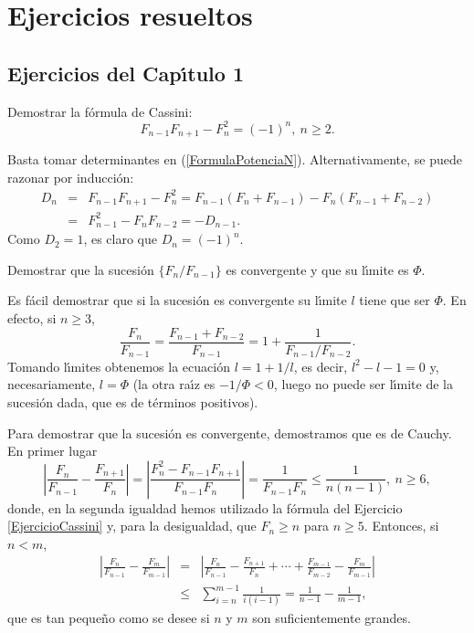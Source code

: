 \chapter{Ejercicios resueltos}
\label{ApendiceEjercicios}

\section{Ejercicios del Cap\'\i tulo 1}

\begin{exercise}\label{EjercicioCassini} Demostrar la f\'ormula de Cassini:
$$F_{n-1}F_{n+1}-F_n^2=(-1)^n,\ n\geq 2.$$
\end{exercise}

\begin{solution}
Basta tomar determinantes en (\ref{FormulaPotenciaN}). Alternativamente, se puede razonar por inducci\'on:
\begin{eqnarray*}D_n&=&F_{n-1}F_{n+1}-F_n^2=F_{n-1}(F_n+F_{n-1})-F_n(F_{n-1}+F_{n-2})\\ &=&
F_{n-1}^2-F_nF_{n-2}=-D_{n-1}.\end{eqnarray*}
Como $D_2=1$, es claro que $D_n=(-1)^n$.
\end{solution}

\begin{exercise}\label{EjercicioConvergencia} Demostrar que la sucesi\'on $\{F_n/F_{n-1}\}$ es convergente y que su l\'\i mite es $\Phi$.
\end{exercise}

\begin{solution}
Es f\'acil demostrar que si la sucesi\'on es convergente su l\'\i mite $l$ tiene que ser $\Phi$. En efecto, si $n\geq 3$,
$$\frac{F_n}{F_{n-1}}=\frac{F_{n-1}+F_{n-2}}{F_{n-1}}=1+\frac{1}{F_{n-1}/F_{n-2}}.$$
Tomando l\'\i mites obtenemos la ecuaci\'on $l=1+1/l$, es decir, $l^2-l-1=0$ y, necesariamente, $l=\Phi$ (la otra ra\'\i z es $-1/\Phi<0$, luego no puede ser l\'\i mite de la sucesi\'on dada, que es de t\'erminos positivos).

Para demostrar que la sucesi\'on es convergente, demostramos que es de Cauchy. En primer lugar
$$\left|\frac{F_n}{F_{n-1}}-\frac{F_{n+1}}{F_n}\right|=\left|\frac{F_n^2-F_{n-1}F_{n+1}}{F_{n-1}F_n}\right|=\frac{1}{F_{n-1}F_n}\leq \frac{1}{n(n-1)},\ n\geq 6,$$
donde, en la segunda igualdad hemos utilizado la f\'ormula  del Ejercicio \ref{EjercicioCassini} y, para la desigualdad, que $F_n\geq n$ para $n\geq 5$.
Entonces, si $n<m$,
\begin{eqnarray*}\left|\frac{F_n}{F_{n-1}}-\frac{F_m}{F_{m-1}}\right|&=&
\left|\frac{F_n}{F_{n-1}}-\frac{F_{n+1}}{F_n}+\cdots +\frac{F_{m-1}}{F_{m-2}}-\frac{F_m}{F_{m-1}}\right|\\ &\leq& \sum_{i=n}^{m-1}\frac{1}{i(i-1)}=\frac{1}{n-1}-\frac{1}{m-1},\end{eqnarray*}
que es tan peque\~no como se desee si $n$ y $m$ son suficientemente grandes.
\end{solution}

